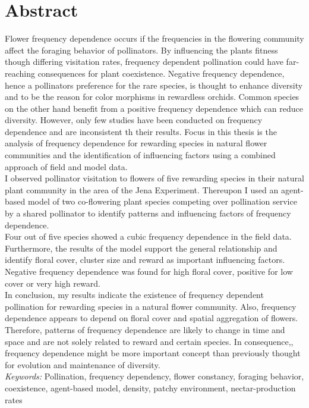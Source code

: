 \label{ch:abstract}

\section*{Abstract}

Flower frequency dependence occurs if the frequencies in the flowering community affect the foraging behavior of   pollinators. By influencing the plants fitness though differing visitation rates, frequency dependent pollination could have far-reaching consequences for plant coexistence. Negative frequency dependence, hence a pollinators preference for the rare species, is thought to enhance diversity and to be the reason for color morphisms in rewardless orchids. Common species on the other hand benefit from a positive frequency dependence which can reduce diversity. However, only few studies have been conducted on frequency dependence and are inconsistent th their results. Focus in this thesis is the analysis of frequency dependence for rewarding species in natural flower communities and the identification of influencing factors using a combined approach of field and model data.\\
I observed pollinator visitation to flowers of five rewarding species in their natural plant community in the area of the Jena Experiment. Thereupon I used an agent-based model of two co-flowering plant species competing over pollination service by a shared pollinator to identify patterns and influencing factors of frequency dependence. \\
Four out of five species showed a cubic frequency dependence in the field data. Furthermore, the results of the model support the general relationship and identify floral cover, cluster size and reward as important influencing factors. Negative frequency dependence was found for high floral cover, positive for low cover or very high reward.\\
In conclusion, my results indicate the existence of frequency dependent pollination for rewarding species in a natural flower community. Also, frequency dependence appears to depend on floral cover and spatial aggregation of flowers. Therefore, patterns of frequency dependence are likely to change in time and space and are not solely related to reward and certain species. In consequence,, frequency dependence might be more important concept than previously thought for evolution and maintenance of diversity. \\

\vspace{1cm}
\small{{\textit{Keywords:} Pollination, frequency dependency, flower constancy, foraging behavior, coexistence, agent-based model, density, patchy environment, nectar-production rates}}
